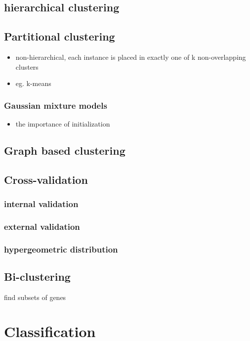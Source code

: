 \documentclass[font=12pt]{article}
\begin{document}
\subsection{hierarchical clustering}

\subsection{Partitional clustering}
\begin{itemize}
	\item non-hierarchical, each instance is placed in exactly one of k non-overlapping clusters
	\item eg. k-means
\end{itemize}

\subsubsection{Gaussian mixture models}
\begin{itemize}
	\item the importance of initialization
\end{itemize}
\subsection{Graph based clustering}

\subsection{Cross-validation}
\subsubsection{internal validation}
\subsubsection{external validation}
\subsubsection{hypergeometric distribution}

\subsection{Bi-clustering}
find subsets of genes 

\newpage
\section{Classification}
\end{document}
